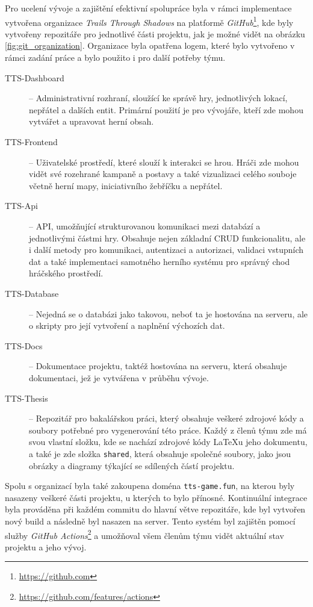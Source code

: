 Pro ucelení vývoje a zajištění efektivní spolupráce byla v rámci implementace vytvořena organizace \textit{Trails Through Shadows} na platformě \textit{GitHub}\footnote{\href{https://github.com}{https://github.com}}, kde byly vytvořeny repozitáře pro jednotlivé části projektu, jak je možné vidět na obrázku \ref{fig:git_organization}. Organizace byla opatřena logem, které bylo vytvořeno v rámci zadání práce a bylo použito i pro další potřeby týmu.

\begin{description}
    \item [TTS-Dashboard] -- Administrativní rozhraní, sloužící ke správě hry, jednotlivých lokací, nepřátel a dalších entit. Primární použití je pro vývojáře, kteří zde mohou vytvářet a upravovat herní obsah.
    \item [TTS-Frontend] -- Uživatelské prostředí, které slouží k interakci se hrou. Hráči zde mohou vidět své rozehrané kampaně a postavy a také vizualizaci celého souboje včetně herní mapy, iniciativního žebříčku a nepřátel.
    \item [TTS-Api] -- API, umožňující strukturovanou komunikaci mezi databází a jednotlivými částmi hry. Obsahuje nejen základní CRUD funkcionalitu, ale i další metody pro komunikaci, autentizaci a autorizaci, validaci vstupních dat a také implementaci samotného herního systému pro správný chod hráčského prostředí.
    \item [TTS-Database] -- Nejedná se o databázi jako takovou, neboť ta je hostována na serveru, ale o skripty pro její vytvoření a naplnění výchozích dat.
    \item [TTS-Docs] -- Dokumentace projektu, taktéž hostována na serveru, která obsahuje dokumentaci, jež je vytvářena v průběhu vývoje.
    \item [TTS-Thesis] -- Repozitář pro bakalářskou práci, který obsahuje veškeré zdrojové kódy a soubory potřebné pro vygenerování této práce. Každý z členů týmu zde má svou vlastní složku, kde se nachází zdrojové kódy \LaTeX{u} jeho dokumentu, a také je zde složka \texttt{shared}, která obsahuje společné soubory, jako jsou obrázky a diagramy týkající se sdílených částí projektu. 
\end{description}

Spolu s organizací byla také zakoupena doména \texttt{tts-game.fun}, na kterou byly nasazeny veškeré části projektu, u kterých to bylo přínosné. Kontinuální integrace byla prováděna při každém commitu do hlavní větve repozitáře, kde byl vytvořen nový build a následně byl nasazen na server. Tento systém byl zajištěn pomocí služby \textit{GitHub Actions}\footnote{\href{https://github.com/features/actions}{https://github.com/features/actions}} a umožňoval všem členům týmu vidět aktuální stav projektu a jeho vývoj.

